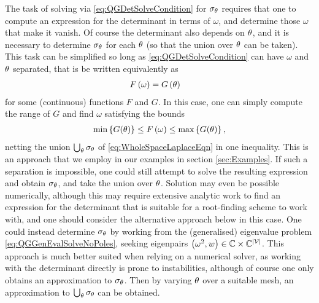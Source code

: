 The task of solving via \eqref{eq:QGDetSolveCondition} for $\sigma_\theta$ requires that one to compute an expression for the determinant in terms of $\omega$, and determine those $\omega$ that make it vanish.
Of course the determinant also depends on $\theta$, and it is necessary to determine $\sigma_\theta$ for each $\theta$ (so that the union over $\theta$ can be taken).
This task can be simplified so long as \eqref{eq:QGDetSolveCondition} can have $\omega$ and $\theta$ separated, that is be written equivalently as
\begin{align*}
	F\left( \omega \right) &= G\left( \theta \right)
\end{align*}
for some (continuous) functions $F$ and $G$.
In this case, one can simply compute the range of $G$ and find $\omega$ satisfying the bounds
\begin{align*}
	\min\left\{ G(\theta) \right\} \leq F\left( \omega \right) \leq \max\left\{ G(\theta) \right\},
\end{align*}
netting the union $\bigcup_{\theta}\sigma_\theta$ of \eqref{eq:WholeSpaceLaplaceEqn} in one inequality.
This is an approach that we employ in our examples in section \ref{sec:Examples}.
If such a separation is impossible, one could still attempt to solve the resulting expression and obtain $\sigma_\theta$, and take the union over $\theta$.
Solution may even be possible numerically, although this may require extensive analytic work to find an expression for the determinant that is suitable for a root-finding scheme to work with, and one should consider the alternative approach below in this case.
One could instead determine $\sigma_\theta$ by working from the (generalised) eigenvalue problem \eqref{eq:QGGenEvalSolveNoPoles}, seeking eigenpairs $\left( \omega^2, w \right)\in\mathbb{C}\times\mathbb{C}^{\left\lvert \mathcal{V} \right\rvert}$.
This approach is much better suited when relying on a numerical solver, as working with the determinant directly is prone to instabilities, although of course one only obtains an approximation to $\sigma_\theta$.
Then by varying $\theta$ over a suitable mesh, an approximation to $\bigcup_{\theta}\sigma_\theta$ can be obtained.

